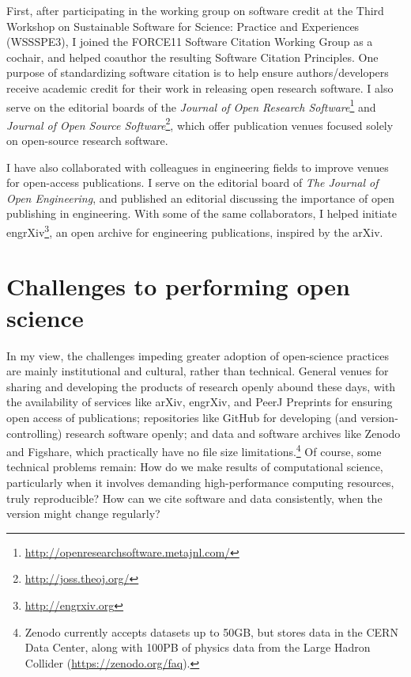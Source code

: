 \documentclass[nobib]{tufte-handout}
\begin{document}
First, after participating in the working group on software credit at the Third
Workshop on Sustainable Software for Science: Practice and Experiences
(WSSSPE3)\autocite{Katz:2016er}, I joined the FORCE11 Software Citation Working
Group as a cochair, and helped coauthor the resulting Software Citation
Principles\autocite{Smith:2016kt}. One purpose of standardizing software
citation is to help ensure authors\slash developers receive academic credit for
their work in releasing open research software. I also serve on the editorial
boards of the \textit{Journal of Open Research
Software}\footnote{\url{http://openresearchsoftware.metajnl.com/}}
and \textit{Journal of Open Source Software}\footnote{\url{http://joss.theoj.org/}},
which offer publication venues focused solely on open-source research software.

I have also collaborated with colleagues in engineering fields to improve
venues for open-access publications. I serve on the editorial board of
\textit{The Journal of Open Engineering},
and published an editorial discussing the importance of open publishing in
engineering\autocite{TJOE:editorial}. With some of the same collaborators, I
helped initiate engrXiv\footnote{\url{http://engrxiv.org}}, an open archive
for engineering publications, inspired by the arXiv.


\section{Challenges to performing open science}
\label{sec:challenges}

In my view, the challenges impeding greater adoption of open-science practices
are mainly institutional and cultural, rather than technical. General venues for sharing
and developing the products of research openly abound these days, with the availability
of services like arXiv, engrXiv, and PeerJ Preprints for ensuring open access of
publications; repositories like GitHub for developing (and version-controlling)
research software openly; and data and software archives like Zenodo and Figshare,
which practically have no file size limitations.\footnote{Zenodo currently accepts
datasets up to 50GB, but stores data in the CERN Data Center, along with 100PB of
physics data from the Large Hadron Collider (\url{https://zenodo.org/faq}).}
Of course, some technical problems remain: How do we make results of computational
science, particularly when it involves demanding high-performance computing resources,
truly reproducible? How can we cite software and data consistently, when
the version might change regularly?
\end{document}
